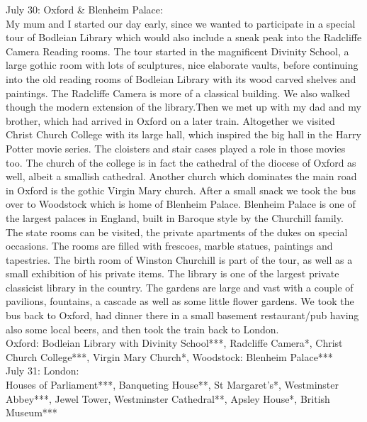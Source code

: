 July 30: Oxford \& Blenheim Palace:\\
My mum and I started our day early, since we wanted to participate in a special tour of Bodleian Library which would also include a sneak peak into the Radcliffe Camera Reading rooms. The tour started in the magnificent Divinity School, a large gothic room with lots of sculptures, nice elaborate vaults, before continuing into the old reading rooms of Bodleian Library with its wood carved shelves and paintings. The Radcliffe Camera is more of a classical building. We also walked though the modern extension of the library.Then we met up with my dad and my brother, which had arrived in Oxford on a later train. Altogether we visited Christ Church College with its large hall, which inspired the big hall in the Harry Potter movie series. The cloisters and stair cases played a role in those movies too. The church of the college is in fact the cathedral of the diocese of Oxford as well, albeit a smallish cathedral. Another church which dominates the main road in Oxford is the gothic Virgin Mary church. After a small snack we took the bus over to Woodstock which is home of Blenheim Palace. Blenheim Palace is one of the largest palaces in England, built in Baroque style by the Churchill family. The state rooms can be visited, the private apartments of the dukes on special occasions. The rooms are filled with frescoes, marble statues, paintings and tapestries. The birth room of Winston Churchill is part of the tour, as well as a small exhibition of his private items. The library is one of the largest private classicist library in the country. The gardens are large and vast with a couple of pavilions, fountains, a cascade as well as some little flower gardens. We took the bus back to Oxford, had dinner there in a small basement restaurant/pub having also some local beers, and then took the train back to London.\\
 
Oxford: Bodleian Library with Divinity School***, Radcliffe Camera*, Christ Church College***, Virgin Mary Church*, Woodstock: Blenheim Palace***\\

July 31: London:\\
Houses of Parliament***, Banqueting House**, St Margaret's*, Westminster Abbey***, Jewel Tower, Westminster Cathedral**, Apsley House*, British Museum***\\

